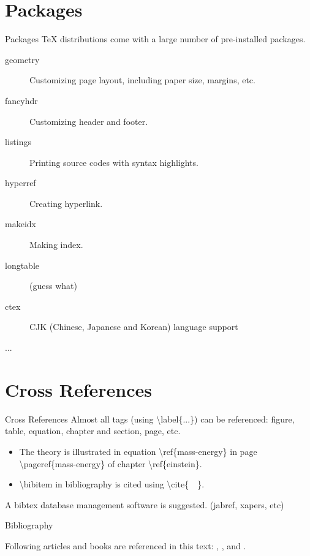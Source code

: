 \documentclass[10pt]{beamer}
\begin{document}
\section{Packages}
\begin{frame}{Packages}
    \TeX{} distributions come with a large number of pre-installed packages.
\begin{description}
    \item [geometry] Customizing page layout, including paper size,
        margins, etc.
    \item [fancyhdr] Customizing header and footer.
    \item [listings] Printing source codes with syntax highlights.
    \item [hyperref] Creating hyperlink.
    \item [makeidx] Making index.
    \item [longtable] (guess what)
    \item [ctex] CJK (Chinese, Japanese and Korean) language support
    \item [...]
\end{description}
\end{frame}

\section{Cross References}
\begin{frame}{Cross References}
    Almost all tags (using \textbackslash label\{...\})
    can be referenced: figure, table, equation,
    chapter and section, page, etc.
\begin{itemize}
    \item The theory is illustrated in equation
        \alert{\textbackslash ref\{mass-energy\}} in page 
        \alert{\textbackslash pageref\{mass-energy\}} of chapter
        \alert{\textbackslash ref\{einstein\}}.

    \item \textbackslash bibitem in bibliography is cited using
        \textbackslash cite\{\ \ \}.
\end{itemize}
A bibtex database management software is suggested.
(jabref, xapers, etc)
\end{frame}

\begin{frame}{Bibliography}

 Following articles and books are referenced in this text:
    \cite{Knuth_texbook}, \cite{texmanual}, \cite{David_tex_land} and
    \cite{website:top500}.


    
    
\end{frame}
\end{document}
